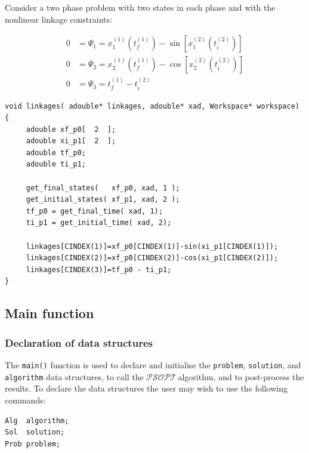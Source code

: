 \documentclass[a4paper,11pt]{report}    %
\newcommand{\psopt}{$\mathcal{PSOPT}$\,}  %
\newenvironment{shadedframe}{%
  \def\FrameCommand{\fcolorbox{black}{shadecolor}}%
  \MakeFramed {\FrameRestore}}
{\endMakeFramed}
\begin{document}
\begin{shadedframe}
Consider a two phase problem with two
states in each phase and with the nonlinear linkage constraints:

   \begin{equation}
        \begin{aligned}
             0 &= \Psi_1 = x_1^{(1)}(t_f^{(1)})-\sin[ x_1^{(2)} (t_i^{(2)} )]  \\
             0 &= \Psi_2 = x_2^{(1)}(t_f^{(1)})-\cos[x_2^{(2)} (t_i^{(2)} )] \\
             0 &= \Psi_3 = t_f^{(1)} - t_i^{(2)} 
        \end{aligned}
   \end{equation}

\small
\begin{verbatim}
void linkages( adouble* linkages, adouble* xad, Workspace* workspace)
{
     adouble xf_p0[  2  ];
     adouble xi_p1[  2  ];
     adouble tf_p0;
     adouble ti_p1;

     get_final_states(   xf_p0, xad, 1 );
     get_initial_states( xf_p1, xad, 2 );
     tf_p0 = get_final_time( xad, 1);
     ti_p1 = get_initial_time( xad, 2);

     linkages[CINDEX(1)]=xf_p0[CINDEX(1)]-sin(xi_p1[CINDEX(1)]);
     linkages[CINDEX(2)]=xf_p0[CINDEX(2)]-cos(xi_p1[CINDEX(2)]);
     linkages[CINDEX(3)]=tf_p0 - ti_p1;
}
\end{verbatim}
\normalsize
\end{shadedframe}

\subsection{Main function} \label{sec:main_fun}

\subsubsection{Declaration of data structures}

The \texttt{main()} function is used to declare and initialise the \verb|problem|,
\verb|solution|, and \verb|algorithm| data structures, to call the \psopt algorithm, and to post-process
the results. To declare the data structures the user may wish to use the following
commands:

\begin{verbatim}
Alg  algorithm;
Sol  solution;
Prob problem;
\end{verbatim}
\end{document}
